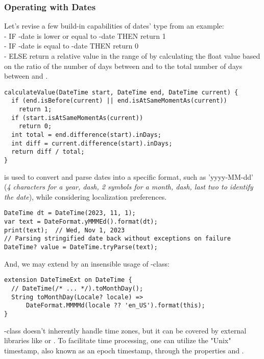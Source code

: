 \subsubsection{Operating with Dates}

Let's revise a few build-in capabilities of dates' type from an example:\\
- IF -date is lower or equal to -date THEN return 1\\
- IF -date is equal to -date THEN return 0\\
- ELSE return a relative value in the range of  by calculating the float value based on the ratio of the number 
of days between  and  to the total number of days between  and .

\begin{lstlisting}
calculateValue(DateTime start, DateTime end, DateTime current) {
  if (end.isBefore(current) || end.isAtSameMomentAs(current))
    return 1;
  if (start.isAtSameMomentAs(current))
    return 0;  
  int total = end.difference(start).inDays;
  int diff = current.difference(start).inDays;
  return diff / total;
}
\end{lstlisting}

\noindent {} is used to convert and parse dates into a specific format, such as 'yyyy-MM-dd' 
(\emph{4 characters for a year, dash, 2 symbols for a month, dash, last two to identify the date}), while considering 
localization preferences.

\begin{lstlisting}
DateTime dt = DateTime(2023, 11, 1);
var text = DateFormat.yMMMEd().format(dt);
print(text);  // Wed, Nov 1, 2023
// Parsing stringified date back without exceptions on failure
DateTime? value = DateTime.tryParse(text);
\end{lstlisting}

\noindent And, we may extend  by an insensible usage of -class:

\begin{lstlisting}
extension DateTimeExt on DateTime {
  // DateTime(/* ... */).toMonthDay(); 
  String toMonthDay(Locale? locale) =>
      DateFormat.MMMMd(locale ?? 'en_US').format(this);
}
\end{lstlisting}

\noindent {}-class doesn't inherently handle time zones, but it can be covered by external libraries like 
 or . To facilitate time processing, one can utilize the "Unix" timestamp, also known as an epoch 
timestamp, through the properties  and . 
 
